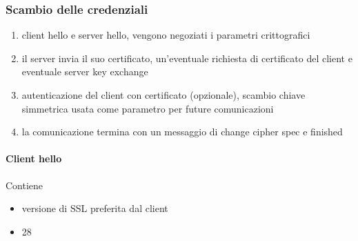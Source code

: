 \documentclass[11pt]{article}
\begin{document}
\subsubsection{Scambio delle credenziali}
\begin{enumerate}
    \item client hello e server hello, vengono negoziati i parametri crittografici
    \item il server invia il suo certificato, un'eventuale richiesta di certificato del client e eventuale server key exchange 
    \item autenticazione del client con certificato (opzionale), scambio chiave simmetrica usata come parametro per future 
    comunicazioni 
    \item la comunicazione termina con un messaggio di change cipher spec e finished
\end{enumerate}
\paragraph*{Client hello}
Contiene
\begin{itemize}
    \item versione di SSL preferita dal client 
    \item 28
\end{itemize}
\end{document}
